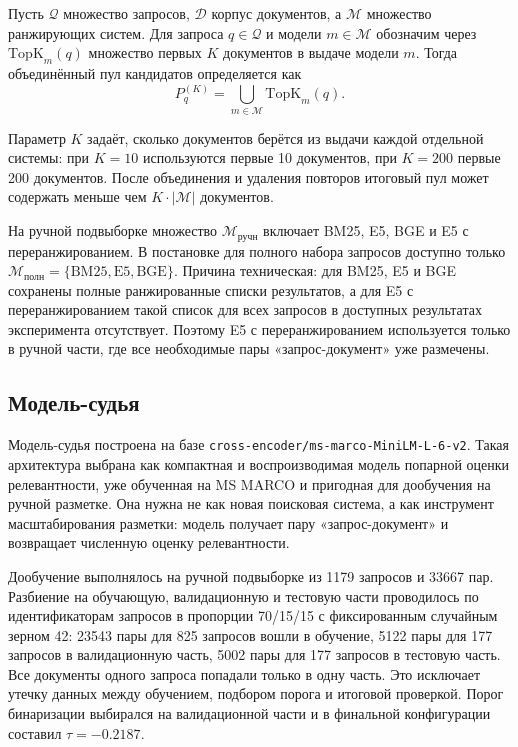 \documentclass[10pt,a4paper,twocolumn]{article}
\begin{document}
Пусть $\mathcal{Q}$ \textemdash{} множество запросов, $\mathcal{D}$ \textemdash{} корпус документов, а $\mathcal{M}$ \textemdash{} множество ранжирующих систем. Для запроса $q \in \mathcal{Q}$ и модели $m \in \mathcal{M}$ обозначим через $\mathrm{TopK}_m(q)$ множество первых $K$ документов в выдаче модели $m$. Тогда объединённый пул кандидатов определяется как
\begin{equation}
\label{eq:pool}
P_q^{(K)} = \bigcup_{m \in \mathcal{M}} \mathrm{TopK}_m(q).
\end{equation}

Параметр $K$ задаёт, сколько документов берётся из выдачи каждой отдельной системы: при $K=10$ используются первые 10 документов, при $K=200$ \textemdash{} первые 200 документов. После объединения и удаления повторов итоговый пул может содержать меньше чем $K \cdot |\mathcal{M}|$ документов.

На ручной подвыборке множество $\mathcal{M}_{\text{ручн}}$ включает BM25, E5, BGE и E5 с переранжированием. В постановке для полного набора запросов доступно только $\mathcal{M}_{\text{полн}} = \{\text{BM25}, \text{E5}, \text{BGE}\}$. Причина техническая: для BM25, E5 и BGE сохранены полные ранжированные списки результатов, а для E5 с переранжированием такой список для всех запросов в доступных результатах эксперимента отсутствует. Поэтому E5 с переранжированием используется только в ручной части, где все необходимые пары «запрос-документ» уже размечены.

\subsection{Модель-судья}

Модель-судья построена на базе \texttt{cross-encoder/ms-marco-MiniLM-L-6-v2}. Такая архитектура выбрана как компактная и воспроизводимая модель попарной оценки релевантности, уже обученная на MS MARCO и пригодная для дообучения на ручной разметке. Она нужна не как новая поисковая система, а как инструмент масштабирования разметки: модель получает пару «запрос-документ» и возвращает численную оценку релевантности.

Дообучение выполнялось на ручной подвыборке из 1179 запросов и 33667 пар. Разбиение на обучающую, валидационную и тестовую части проводилось по идентификаторам запросов в пропорции 70/15/15 с фиксированным случайным зерном 42: 23543 пары для 825 запросов вошли в обучение, 5122 пары для 177 запросов \textemdash{} в валидационную часть, 5002 пары для 177 запросов \textemdash{} в тестовую часть. Все документы одного запроса попадали только в одну часть. Это исключает утечку данных между обучением, подбором порога и итоговой проверкой. Порог бинаризации выбирался на валидационной части и в финальной конфигурации составил $\tau = -0.2187$.
\end{document}
